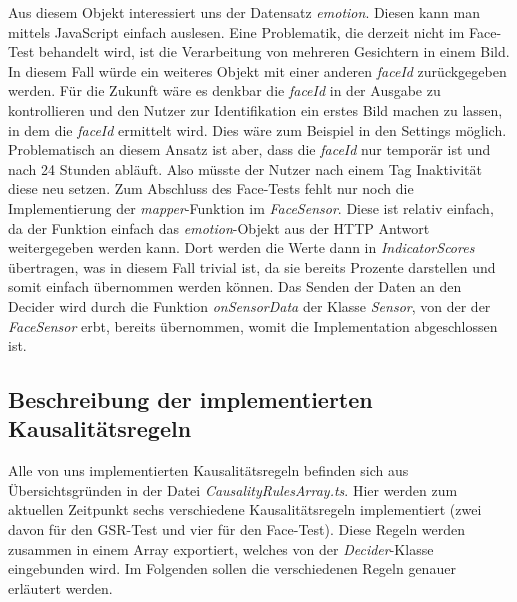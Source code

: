 Aus diesem Objekt interessiert uns der Datensatz \textit{emotion}. Diesen kann man mittels JavaScript einfach auslesen. Eine Problematik, die derzeit nicht im Face-Test behandelt wird, ist die Verarbeitung von mehreren Gesichtern in einem Bild. In diesem Fall würde ein weiteres Objekt mit einer anderen \textit{faceId} zurückgegeben werden. Für die Zukunft wäre es denkbar die \textit{faceId} in der Ausgabe zu kontrollieren und den Nutzer zur Identifikation ein erstes Bild machen zu lassen, in dem die \textit{faceId} ermittelt wird. Dies wäre zum Beispiel in den Settings möglich. Problematisch an diesem Ansatz ist aber, dass die \textit{faceId} nur temporär ist und nach 24 Stunden abläuft. Also müsste der Nutzer nach einem Tag Inaktivität diese neu setzen.\newline
Zum Abschluss des Face-Tests fehlt nur noch die Implementierung der \textit{mapper}-Funktion im \textit{FaceSensor}. Diese ist relativ einfach, da der Funktion einfach das \textit{emotion}-Objekt aus der HTTP Antwort weitergegeben werden kann. Dort werden die Werte dann in \textit{IndicatorScores} übertragen, was in diesem Fall trivial ist, da sie bereits Prozente darstellen und somit einfach übernommen werden können. Das Senden der Daten an den Decider wird durch die Funktion \textit{onSensorData} der Klasse \textit{Sensor}, von der der \textit{FaceSensor} erbt, bereits übernommen, womit die Implementation abgeschlossen ist.   
\subsection{Beschreibung der implementierten Kausalitätsregeln}
Alle von uns implementierten Kausalitätsregeln befinden sich aus Übersichtsgründen in der Datei \textit{CausalityRulesArray.ts}. Hier werden zum aktuellen Zeitpunkt sechs verschiedene Kausalitätsregeln implementiert (zwei davon für den GSR-Test und vier für den Face-Test). Diese Regeln werden zusammen in einem Array exportiert, welches von der \textit{Decider}-Klasse eingebunden wird. Im Folgenden sollen die verschiedenen Regeln genauer erläutert werden.
